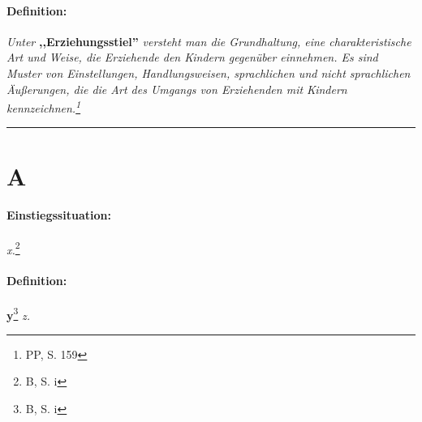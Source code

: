 \documentclass[12pt,a4paper]{article}
\newcommand\einstieg{\paragraph{\color{amethyst} {Einstiegssituation:}}}
\newcommand\definition{\paragraph{\color{red} {Definition:}}}
\begin{document}
\definition {\sl Unter} {\bf ,,Erziehungsstiel''}
\sl{versteht man die Grundhaltung, eine charakteristische Art und Weise, die
  Erziehende den Kindern gegenüber einnehmen. Es sind Muster von Einstellungen,
  Handlungsweisen, sprachlichen und nicht sprachlichen Äußerungen, die die Art
  des Umgangs von Erziehenden mit Kindern kennzeichnen.}\footnote{\label{Erziehungsstiel} PP, S. 159}

\vskip 16pt \hrule
\section{A}

\einstieg {\sl x.}\footnote{\label{F-x} B, S. i}

\definition {\bf y}\footnote{\label{y} B, S. i}
 \sl{z.}

\printindex
\end{document}
